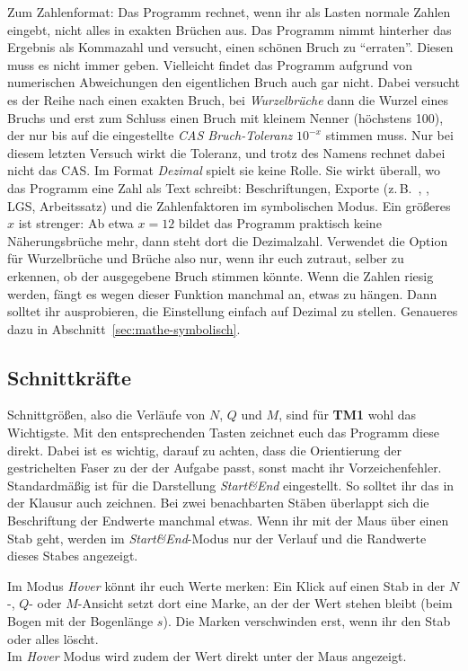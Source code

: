 Zum Zahlenformat: Das Programm rechnet, wenn ihr als Lasten normale Zahlen eingebt, nicht alles in exakten Brüchen aus.
Das Programm nimmt hinterher das Ergebnis als Kommazahl und versucht, einen schönen Bruch zu \enquote{erraten}. Diesen muss es nicht immer geben.
Vielleicht findet das Programm aufgrund von numerischen Abweichungen den eigentlichen Bruch auch gar nicht.
Dabei versucht es der Reihe nach einen exakten Bruch, bei \emph{Wurzelbrüche} dann die Wurzel eines
Bruchs und erst zum Schluss einen Bruch mit kleinem Nenner (höchstens 100), der nur bis auf die
eingestellte \emph{CAS Bruch-Toleranz} $10^{-x}$ stimmen muss. Nur bei diesem letzten Versuch wirkt
die Toleranz, und trotz des Namens rechnet dabei nicht das CAS. Im Format \emph{Dezimal} spielt sie
keine Rolle. Sie wirkt überall, wo das Programm eine Zahl als Text schreibt: Beschriftungen,
Exporte (z.\,B.\ , , LGS, Arbeitssatz) und die Zahlenfaktoren im
symbolischen Modus. Ein größeres $x$ ist strenger: Ab etwa $x = 12$ bildet das Programm praktisch
keine Näherungsbrüche mehr, dann steht dort die Dezimalzahl.
Verwendet die Option für Wurzelbrüche und Brüche also nur, wenn ihr euch zutraut, selber zu erkennen, ob der ausgegebene Bruch stimmen könnte.
Wenn die Zahlen riesig werden, fängt es wegen dieser Funktion manchmal an, etwas zu hängen.
Dann solltet ihr ausprobieren, die Einstellung einfach auf Dezimal zu stellen. Genaueres dazu in Abschnitt~\ref{sec:mathe-symbolisch}.


\subsection{Schnittkräfte}
Schnittgrößen, also die Verläufe von $N$, $Q$ und $M$, sind für \textbf{TM1} wohl das Wichtigste.
Mit den entsprechenden Tasten zeichnet euch das Programm diese direkt. Dabei ist es wichtig, darauf zu achten,
dass die Orientierung der gestrichelten Faser zu der der Aufgabe passt, sonst macht ihr Vorzeichenfehler.
Standardmäßig ist für die Darstellung \emph{Start\&End} eingestellt. So solltet ihr das in der Klausur auch zeichnen.
Bei zwei benachbarten Stäben überlappt sich die Beschriftung der Endwerte manchmal etwas.
Wenn ihr mit der Maus über einen Stab geht, werden im \emph{Start\&End}-Modus nur der Verlauf und die Randwerte dieses Stabes angezeigt.

Im Modus \emph{Hover} könnt ihr euch Werte merken: Ein Klick auf einen Stab in der $N$-, $Q$- oder
$M$-Ansicht setzt dort eine Marke, an der der Wert stehen bleibt (beim Bogen mit der Bogenlänge
$s$). Die Marken verschwinden erst, wenn ihr den Stab oder alles löscht.\\
Im \emph{Hover} Modus wird zudem der Wert direkt unter der Maus angezeigt.

